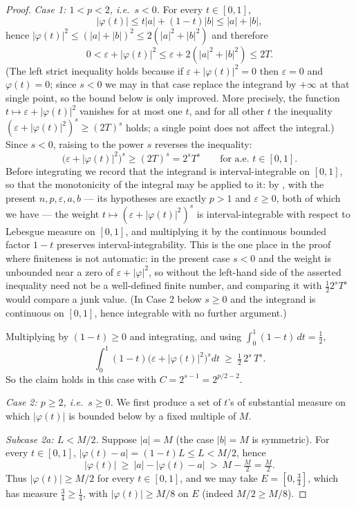 \begin{proof}
\emph{Case 1: $1<p<2$, i.e.\ $s<0$.}  For every $t\in[0,1]$,
\[
|\varphi(t)|\le t|a|+(1-t)|b|\le|a|+|b| ,
\]
hence $|\varphi(t)|^2\le(|a|+|b|)^2\le2(|a|^2+|b|^2)$ and therefore
\[
0<\varepsilon+|\varphi(t)|^2\le\varepsilon+2(|a|^2+|b|^2)\le 2T .
\]
(The left strict inequality holds because if $\varepsilon+|\varphi(t)|^2=0$ then
$\varepsilon=0$ and $\varphi(t)=0$; since $s<0$ we may in that case replace the
integrand by $+\infty$ at that single point, so the bound below is only
improved. More precisely, the function $t\mapsto\varepsilon+|\varphi(t)|^2$
vanishes for at most one $t$, and for all other $t$ the inequality
$(\varepsilon+|\varphi(t)|^2)^{s}\ge(2T)^{s}$ holds; a single point does not
affect the integral.)  Since $s<0$, raising to the power $s$ reverses the
inequality:
\[
\bigl(\varepsilon+|\varphi(t)|^2\bigr)^{s}\ge(2T)^{s}=2^{s}T^{s}
\qquad\text{for a.e.\ }t\in[0,1].
\]
Before integrating we record that the integrand is interval-integrable on
$[0,1]$, so that the monotonicity of the integral may be applied to it: by
, with the present $n,p,\varepsilon,a,b$ --- its
hypotheses are exactly $p>1$ and $\varepsilon\ge0$, both of which we have --- the
weight $t\mapsto(\varepsilon+|\varphi(t)|^2)^{s}$ is interval-integrable with
respect to Lebesgue measure on $[0,1]$, and multiplying it by the continuous
bounded factor $1-t$ preserves interval-integrability.  This is the one place in
the proof where finiteness is not automatic: in the present case $s<0$ and the
weight is unbounded near a zero of $\varepsilon+|\varphi|^2$, so without
 the left-hand side of the asserted inequality
need not be a well-defined finite number, and comparing it with
$\tfrac12 2^{s}T^{s}$ would compare a junk value.  (In Case 2 below $s\ge0$ and
the integrand is continuous on $[0,1]$, hence integrable with no further
argument.)

Multiplying by $(1-t)\ge0$ and integrating, and using
$\int_0^1(1-t)\,dt=\tfrac12$,
\[
\int_0^1(1-t)\bigl(\varepsilon+|\varphi(t)|^2\bigr)^{s}dt\ \ge\ \tfrac12\,2^{s}\,T^{s} .
\]
So the claim holds in this case with $C=2^{s-1}=2^{p/2-2}$.

\emph{Case 2: $p\ge2$, i.e.\ $s\ge0$.}  We first produce a set of $t$'s of
substantial measure on which $|\varphi(t)|$ is bounded below by a fixed multiple
of $M$.

\emph{Subcase 2a: $L<M/2$.}  Suppose $|a|=M$ (the case $|b|=M$ is symmetric).
For every $t\in[0,1]$, $|\varphi(t)-a|=(1-t)L\le L<M/2$, hence
\[
|\varphi(t)|\ \ge\ |a|-|\varphi(t)-a|\ >\ M-\tfrac M2=\tfrac M2 .
\]
Thus $|\varphi(t)|\ge M/2$ for every $t\in[0,1]$, and we may take
$E=[0,\tfrac34]$, which has measure $\tfrac34\ge\tfrac14$, with
$|\varphi(t)|\ge M/8$ on $E$ (indeed $M/2\ge M/8$).


\end{proof}
